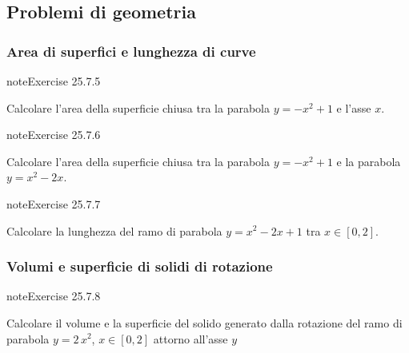 \documentclass[letterpaper,10pt,italian]{jupyterBook}
\begin{document}
\subsection{Problemi di geometria}
\label{\detokenize{ch/infinitesimal_calculus/integrals-problems:problemi-di-geometria}}

\subsubsection{Area di superfici e lunghezza di curve}
\label{\detokenize{ch/infinitesimal_calculus/integrals-problems:area-di-superfici-e-lunghezza-di-curve}} \label{exercise:ch/infinitesimal_calculus/integrals-problems-exercise-4}

\begin{sphinxadmonition}{note}{Exercise 25.7.5}



\sphinxAtStartPar
Calcolare l’area della superficie chiusa tra la parabola \(y = - x^2 + 1\) e l’asse \(x\).
\end{sphinxadmonition}
 \label{exercise:ch/infinitesimal_calculus/integrals-problems-exercise-5}

\begin{sphinxadmonition}{note}{Exercise 25.7.6}



\sphinxAtStartPar
Calcolare l’area della superficie chiusa tra la parabola \(y = - x^2 + 1\) e la parabola \(y = x^2 - 2 x\).
\end{sphinxadmonition}
 \label{exercise:ch/infinitesimal_calculus/integrals-problems-exercise-6}

\begin{sphinxadmonition}{note}{Exercise 25.7.7}



\sphinxAtStartPar
Calcolare la lunghezza del ramo di parabola \(y = x^2 - 2x + 1\) tra \(x \in [0,2]\).
\end{sphinxadmonition}


\subsubsection{Volumi e superficie di solidi di rotazione}
\label{\detokenize{ch/infinitesimal_calculus/integrals-problems:volumi-e-superficie-di-solidi-di-rotazione}} \label{exercise:ch/infinitesimal_calculus/integrals-problems-exercise-7}

\begin{sphinxadmonition}{note}{Exercise 25.7.8}





\sphinxAtStartPar
Calcolare il volume e la superficie del solido generato dalla rotazione del ramo di parabola \(y = 2\, x^2\), \(x \in [0,2]\) attorno all’asse \(y\)
\end{sphinxadmonition}
 \label{exercise:ch/infinitesimal_calculus/integrals-problems-exercise-8}
\end{document}
